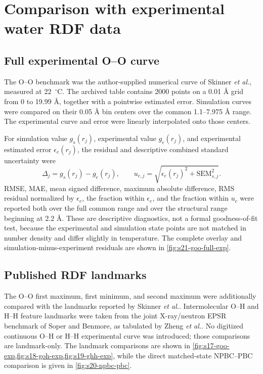 \documentclass[11pt]{article}
\newcommand{\angstrom}{\text{\AA}}
\begin{document}
\section{Comparison with experimental water RDF data}

\subsection{Full experimental O--O curve}

The O--O benchmark was the author-supplied numerical curve of Skinner
\emph{et al.}\cite{Skinner2013}, measured at 22~\(^{\circ}\)C.  The archived
table contains 2000 points on a 0.01 \(\angstrom\) grid from 0 to
19.99 \(\angstrom\), together with a pointwise estimated error.  Simulation
curves were compared on their 0.05 \(\angstrom\) bin centers over the common
1.1--7.975 \(\angstrom\) range.  The experimental curve and error were
linearly interpolated onto those centers.

For simulation value \(g_s(r_j)\), experimental value \(g_e(r_j)\), and
experimental estimated error \(\epsilon_e(r_j)\), the residual and descriptive
combined standard uncertainty were
\begin{equation}
 \Delta_j=g_s(r_j)-g_e(r_j),\qquad
 u_{c,j}=\sqrt{\epsilon_e(r_j)^2+\mathrm{SEM}_{s,j}^2}.
 \label{eq:experiment-residual}
\end{equation}
RMSE, MAE, mean signed difference, maximum absolute difference, RMS residual
normalized by \(\epsilon_e\), the fraction within \(\epsilon_e\), and the
fraction within \(u_c\) were reported both over the full common range and over
the structural range beginning at 2.2 \(\angstrom\).  These are descriptive
diagnostics, not a formal goodness-of-fit test, because the experimental and
simulation state points are not matched in number density and differ slightly
in temperature.
The complete overlay and simulation-minus-experiment residuals are shown in
\cref{fig:s21-goo-full-exp}.

\subsection{Published RDF landmarks}

The O--O first maximum, first minimum, and second maximum were additionally
compared with the landmarks reported by Skinner \emph{et al.}\cite{Skinner2013}.
Intermolecular O--H and H--H feature landmarks were taken from the joint
X-ray/neutron EPSR benchmark of Soper and Benmore\cite{Soper2008}, as tabulated
by Zheng \emph{et al.}\cite{Zheng2018}.  No digitized continuous O--H or H--H
experimental curve was introduced; those comparisons are landmark-only.
The landmark comparisons are shown in
\cref{fig:s17-goo-exp,fig:s18-goh-exp,fig:s19-ghh-exp}, while the direct
matched-state NPBC--PBC comparison is given in \cref{fig:s20-npbc-pbc}.
\end{document}
